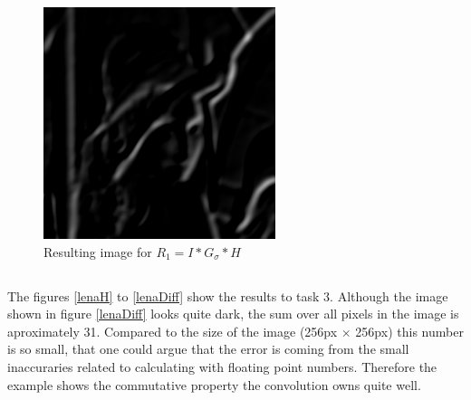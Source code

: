 \documentclass{article}
\begin{document}
\begin{figure}[H]
  \begin{center}
    \includegraphics[width=\textwidth]{./images/imR1}
    \caption{Resulting image for $R_1 = I * G_{\sigma} * H$}
    \label{lenaR1}
  \end{center}
\end{figure}

\subsection{}
The figures \ref{lenaH} to \ref{lenaDiff} show the results to task 3. Although the image shown in figure \ref{lenaDiff} looks quite dark, the sum over all pixels in the image is aproximately 31. Compared to the size of the image (256px $\times$ 256px) this number is so small, that one could argue that the error is coming from the small inaccuraries related to calculating with floating point numbers.
Therefore the example shows the commutative property the convolution owns quite well.
\end{document}

